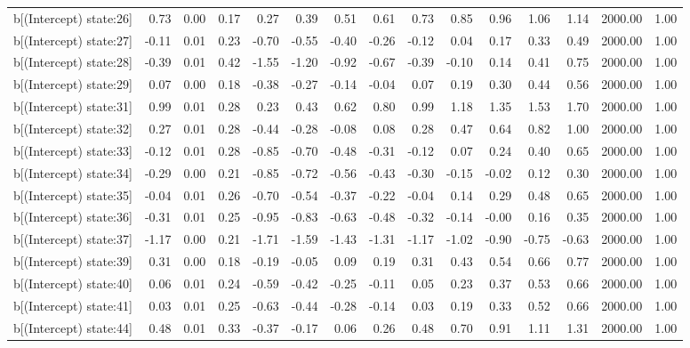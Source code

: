 \begin{table}[ht]
\begin{tabular}{rrrrrrrrrrrrrrr}
  b[(Intercept) state:26] & 0.73 & 0.00 & 0.17 & 0.27 & 0.39 & 0.51 & 0.61 & 0.73 & 0.85 & 0.96 & 1.06 & 1.14 & 2000.00 & 1.00 \\ 
  b[(Intercept) state:27] & -0.11 & 0.01 & 0.23 & -0.70 & -0.55 & -0.40 & -0.26 & -0.12 & 0.04 & 0.17 & 0.33 & 0.49 & 2000.00 & 1.00 \\ 
  b[(Intercept) state:28] & -0.39 & 0.01 & 0.42 & -1.55 & -1.20 & -0.92 & -0.67 & -0.39 & -0.10 & 0.14 & 0.41 & 0.75 & 2000.00 & 1.00 \\ 
  b[(Intercept) state:29] & 0.07 & 0.00 & 0.18 & -0.38 & -0.27 & -0.14 & -0.04 & 0.07 & 0.19 & 0.30 & 0.44 & 0.56 & 2000.00 & 1.00 \\ 
  b[(Intercept) state:31] & 0.99 & 0.01 & 0.28 & 0.23 & 0.43 & 0.62 & 0.80 & 0.99 & 1.18 & 1.35 & 1.53 & 1.70 & 2000.00 & 1.00 \\ 
  b[(Intercept) state:32] & 0.27 & 0.01 & 0.28 & -0.44 & -0.28 & -0.08 & 0.08 & 0.28 & 0.47 & 0.64 & 0.82 & 1.00 & 2000.00 & 1.00 \\ 
  b[(Intercept) state:33] & -0.12 & 0.01 & 0.28 & -0.85 & -0.70 & -0.48 & -0.31 & -0.12 & 0.07 & 0.24 & 0.40 & 0.65 & 2000.00 & 1.00 \\ 
  b[(Intercept) state:34] & -0.29 & 0.00 & 0.21 & -0.85 & -0.72 & -0.56 & -0.43 & -0.30 & -0.15 & -0.02 & 0.12 & 0.30 & 2000.00 & 1.00 \\ 
  b[(Intercept) state:35] & -0.04 & 0.01 & 0.26 & -0.70 & -0.54 & -0.37 & -0.22 & -0.04 & 0.14 & 0.29 & 0.48 & 0.65 & 2000.00 & 1.00 \\ 
  b[(Intercept) state:36] & -0.31 & 0.01 & 0.25 & -0.95 & -0.83 & -0.63 & -0.48 & -0.32 & -0.14 & -0.00 & 0.16 & 0.35 & 2000.00 & 1.00 \\ 
  b[(Intercept) state:37] & -1.17 & 0.00 & 0.21 & -1.71 & -1.59 & -1.43 & -1.31 & -1.17 & -1.02 & -0.90 & -0.75 & -0.63 & 2000.00 & 1.00 \\ 
  b[(Intercept) state:39] & 0.31 & 0.00 & 0.18 & -0.19 & -0.05 & 0.09 & 0.19 & 0.31 & 0.43 & 0.54 & 0.66 & 0.77 & 2000.00 & 1.00 \\ 
  b[(Intercept) state:40] & 0.06 & 0.01 & 0.24 & -0.59 & -0.42 & -0.25 & -0.11 & 0.05 & 0.23 & 0.37 & 0.53 & 0.66 & 2000.00 & 1.00 \\ 
  b[(Intercept) state:41] & 0.03 & 0.01 & 0.25 & -0.63 & -0.44 & -0.28 & -0.14 & 0.03 & 0.19 & 0.33 & 0.52 & 0.66 & 2000.00 & 1.00 \\ 
  b[(Intercept) state:44] & 0.48 & 0.01 & 0.33 & -0.37 & -0.17 & 0.06 & 0.26 & 0.48 & 0.70 & 0.91 & 1.11 & 1.31 & 2000.00 & 1.00 \\ 

\end{tabular}
\end{table}
